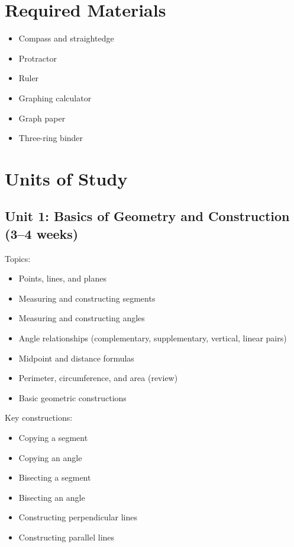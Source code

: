 \documentclass[12pt,oneside]{book}
\begin{document}
\section{Required Materials}
\begin{itemize}[leftmargin=2em]
    \item Compass and straightedge
    \item Protractor
    \item Ruler
    \item Graphing calculator
    \item Graph paper
    \item Three-ring binder
\end{itemize}

\section{Units of Study}

\subsection*{Unit 1: Basics of Geometry and Construction (3--4 weeks)}
Topics:
\begin{itemize}[leftmargin=2em]
    \item Points, lines, and planes
    \item Measuring and constructing segments
    \item Measuring and constructing angles
    \item Angle relationships (complementary, supplementary, vertical, linear pairs)
    \item Midpoint and distance formulas
    \item Perimeter, circumference, and area (review)
    \item Basic geometric constructions
\end{itemize}

Key constructions:
\begin{itemize}[leftmargin=2em]
    \item Copying a segment
    \item Copying an angle
    \item Bisecting a segment
    \item Bisecting an angle
    \item Constructing perpendicular lines
    \item Constructing parallel lines
\end{itemize}
\end{document}

